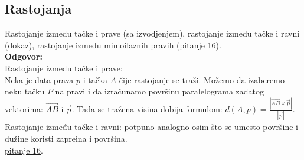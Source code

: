 \documentclass[12pt]{article}
\begin{document}
    \subsection{Rastojanja}
    Rastojanje između tačke i prave (sa izvodjenjem),
    rastojanje između tačke i ravni (dokaz), rastojanje između
    mimoilaznih pravih (pitanje 16).
    \\
    \textbf{Odgovor:}\\
    Rastojanje između tačke i prave:\\
    Neka je data prava $p$ i tačka $A$ čije rastojanje se traži.
    Možemo da izaberemo neku tačku $P$ na pravi i da izračunamo
    površinu paralelograma zadatog vektorima: $\overrightarrow{AB}$ i $\overrightarrow{p}$.
    Tada se tražena visina dobija formulom: $d(A,p)=\frac{|\overrightarrow{AB}\times\overrightarrow{p}|}{|\overrightarrow{p}|}$.\\
Rastojanje između tačke i ravni: potpuno analogno osim što
se umesto površine i dužine koristi zapreina i površina.\\
\hyperlink{subsec:pitanje_16}{pitanje 16}.
\end{document}
